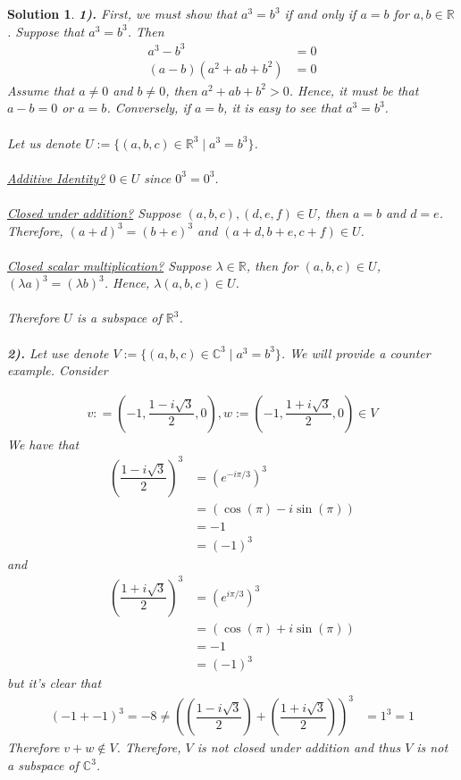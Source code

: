 \documentclass[12pt]{article}
\newcommand{\C}{\mathbb{C}}
\newcommand{\R}{\mathbb{R}}
\theoremstyle{problem}
\newtheorem{sol}{Solution}
\theoremstyle{remark}
\begin{document}
\begin{sol}
    \textbf{1).}
    First, we must show that $a^3 = b^3$ if and only if $a = b$ for $a,b \in \R$. Suppose that $a^3 = b^3$. Then
    \begin{align*}
        a^3 -b^3 &= 0 \\
        (a-b)(a^2 + ab +b^2) &= 0
    \end{align*}
    Assume that $a \neq 0$ and $b \neq 0$, then $a^2 + ab + b^2 >0$. Hence, it must be that $a-b = 0$ or $a = b$. Conversely, if $a = b$, it is easy to see that $a^3 = b^3$. \\ \\
    Let us denote $U := \{(a,b,c) \in \R^3 \mid a^3 = b^3 \}$. \\ \\
     \textit{\underline{Additive Identity?}} $0 \in U$ since $0^3 = 0^3$. \\ \\
     \textit{\underline{Closed under addition?}} Suppose $(a,b,c) , (d,e,f) \in U$, then
     $a=b$ and $d = e$. Therefore, $(a+d)^3 = (b+e)^3$ and $(a+d,b+e,c+f) \in U$. \\ \\ 
     \textit{\underline{Closed scalar multiplication?}} Suppose $\lambda \in \R$, then for $(a,b,c) \in U$, $(\lambda a)^3 = (\lambda b)^3$. Hence, $\lambda(a,b,c) \in U$. \\ \\
     Therefore $U$ is a subspace of $\R^3$. \\ \\
    \textbf{2).} Let use denote $V:= \{(a,b,c) \in \C^3 \mid a^3 =b^3\}$. We will provide a counter example. Consider

    \begin{align*}
        v: =\left(-1, \dfrac{1-i\sqrt{3}}{2},0 \right), w:=\left(-1, \dfrac{1+i\sqrt{3}}{2}, 0\right) \in V
    \end{align*}
    We have that
    \begin{align*}
       \left(\dfrac{1-i\sqrt{3}}{2}\right)^3 &=  \left(e^{-i\pi/3}\right)^3  \\
       &= (\cos(\pi) -i\sin(\pi)) \\
       &=  -1 \\
       &= (-1)^3
    \end{align*}
    and 
    \begin{align*}
      \left(\dfrac{1+i\sqrt{3}}{2}\right)^3 &=  \left(e^{i\pi/3}\right)^3  \\
       &= (\cos(\pi) +i\sin(\pi)) \\
       &=  -1 \\
       &= (-1)^3
    \end{align*}
but it's clear that 
\begin{align*}
    (-1+-1)^3 = -8 \neq
     \left(\left(\dfrac{1-i\sqrt{3}}{2}\right) +  \left(\dfrac{1+i\sqrt{3}}{2}\right)\right)^3 &= 1^3 = 1
\end{align*}
Therefore $v + w \not\in V$. Therefore, $V$ is not closed under addition and thus $V$ is not a subspace of $\C^3$.
\end{sol}
\end{document}
